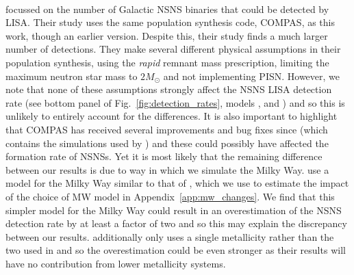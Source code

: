 \paragraph{\citet{Lau+2020}} focussed on the number of Galactic NSNS binaries that could be detected by LISA. Their study uses the same population synthesis code, COMPAS, as this work, though an earlier version. Despite this, their study finds a much larger number of detections. They make several different physical assumptions in their population synthesis, using the \citet{Fryer+2012} \textit{rapid} remnant mass prescription, limiting the maximum neutron star mass to $2 \unit{M_{\odot}}$ and not implementing PISN. However, we note that none of these assumptions strongly affect the NSNS LISA detection rate (see bottom panel of Fig.~\ref{fig:detection_rates}, models \modRapid{}, \modNSLow{} and \modNoPISN{}) and so this is unlikely to entirely account for the differences. It is also important to highlight that COMPAS has received several improvements and bug fixes since \citet{Vigna-Gomez+2018} (which contains the simulations used by \citet{Lau+2020}) and these could possibly have affected the formation rate of NSNSs.
%
Yet it is most likely that the remaining difference between our results is due to way in which we simulate the Milky Way. \citet{Lau+2020} use a model for the Milky Way similar to that of \citet{Breivik+2020}, which we use to estimate the impact of the choice of MW model in Appendix~\ref{app:mw_changes}. We find that this simpler model for the Milky Way could result in an overestimation of the NSNS detection rate by at least a factor of two and so this may explain the discrepancy between our results. \citet{Lau+2020} additionally only uses a single metallicity rather than the two used in \citet{Breivik+2020} and so the overestimation could be even stronger as their results will have no contribution from lower metallicity systems.

